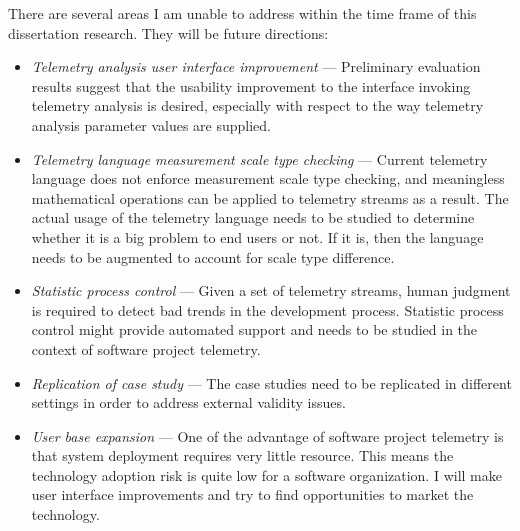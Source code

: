 There are several areas I am unable to address within the time frame of this dissertation research. They will be future directions:

\begin{itemize}
  \item \textit{Telemetry analysis user interface improvement} --- Preliminary evaluation results suggest that the usability improvement to the interface invoking telemetry analysis is desired, especially with respect to the way telemetry analysis parameter values are supplied.
  
	\item \textit{Telemetry language measurement scale type checking} --- Current telemetry language does not enforce measurement scale type checking, and meaningless mathematical operations can be applied to telemetry streams as a result. The actual usage of the telemetry language needs to be studied to determine whether it is a big problem to end users or not. If it is, then the language needs to be augmented to account for scale type difference.
	
	\item \textit{Statistic process control} --- Given a set of telemetry streams, human judgment is required to detect bad trends in the development process. Statistic process control might provide automated support and needs to be studied in the context of software project telemetry.
	
	\item \textit{Replication of case study} --- The case studies need to be replicated in different settings in order to address external validity issues.
	
	\item \textit{User base expansion} --- One of the advantage of software project telemetry is that system deployment requires very little resource. This means the technology adoption risk is quite low for a software organization. I will make user interface improvements and try to find opportunities to market the technology.
\end{itemize}

















